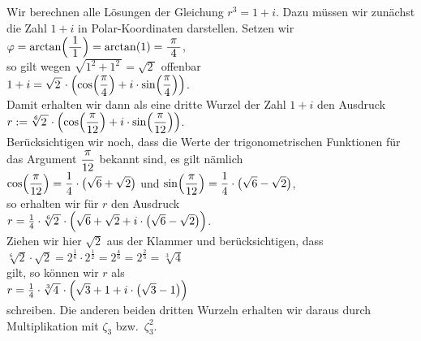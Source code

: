 \example 
Wir berechnen alle L\"{o}sungen der Gleichung $r^3 = 1 + i$.  Dazu m\"{u}ssen wir zun\"{a}chst die Zahl
$1 + i$ in Polar-Koordinaten darstellen.  Setzen wir  
\\[0.2cm]
\hspace*{1.3cm} $\varphi = \arctan\Bigl(\bruch{1}{1}\Bigr) = \arctan(1) = \bruch{\pi}{4}$,
\\[0.2cm]
so gilt wegen $\sqrt{1^2 + 1^2\,} = \sqrt{2\,}$ offenbar
\\[0.2cm]
\hspace*{1.3cm} $\displaystyle1 + i = \sqrt{2\,} \cdot \left(\cos\Bigl(\frac{\pi}{4}\Bigr) + i \cdot \sin\Bigl(\frac{\pi}{4}\Bigr)\right)$.
\\[0.2cm]
Damit erhalten wir dann als eine dritte Wurzel der Zahl $1 + i$ den Ausdruck
\\[0.2cm]
\hspace*{1.3cm}
$\displaystyle r := \sqrt[6]{2\,} \cdot 
      \left(\cos\Bigl(\frac{\pi}{12}\Bigr) + i \cdot \sin\Bigl(\frac{\pi}{12}\Bigr)\right) 
$.
\\[0.2cm]
Ber\"{u}cksichtigen wir noch, dass die Werte der trigonometrischen Funktionen f\"{u}r das Argument
$\displaystyle\frac{\pi}{12}$ bekannt sind, es gilt n\"{a}mlich
\\[0.2cm]
\hspace*{1.3cm} 
$\displaystyle\cos\Bigl(\frac{\pi}{12}\Bigr) = \frac{1}{4} \cdot \bigl(\sqrt{6} + \sqrt{2}\bigr)$ \quad und \quad
$\displaystyle\sin\Bigl(\frac{\pi}{12}\Bigr) = \frac{1}{4} \cdot \bigl(\sqrt{6} - \sqrt{2}\bigr)$,
\\[0.2cm]
so erhalten wir f\"{u}r $r$ den Ausdruck
\\[0.2cm]
\hspace*{1.3cm}
$r = \frac{1}{4} \cdot \sqrt[6]{2\,} \cdot
     \Bigl(\sqrt{6} + \sqrt{2} + i \cdot \bigl(\sqrt{6} - \sqrt{2}\bigr)\Bigr) 
$.
\\[0.2cm]
Ziehen wir hier $\sqrt{2}$ aus der Klammer und ber\"{u}cksichtigen, dass
\\[0.2cm]
\hspace*{1.3cm}
$\sqrt[6]{2} \cdot \sqrt{2} = 2^{\frac{1}{6}} \cdot 2^{\frac{1}{2}} =
 2^{\frac{4}{6}} =  2^{\frac{2}{3}} = \sqrt[3]{4}
$
\\[0.2cm]
gilt, so k\"{o}nnen wir $r$ als
\\[0.2cm]
\hspace*{1.3cm}
$r = \frac{1}{4} \cdot \sqrt[3]{4\,} \cdot \Bigl(\sqrt{3} + 1 + i \cdot \bigl(\sqrt{3} - 1\bigr)\Bigr)$
\\[0.2cm]
schreiben.  Die anderen beiden dritten Wurzeln erhalten wir daraus durch Multiplikation mit
$\zeta_3$ bzw.~$\zeta_3^2$.

